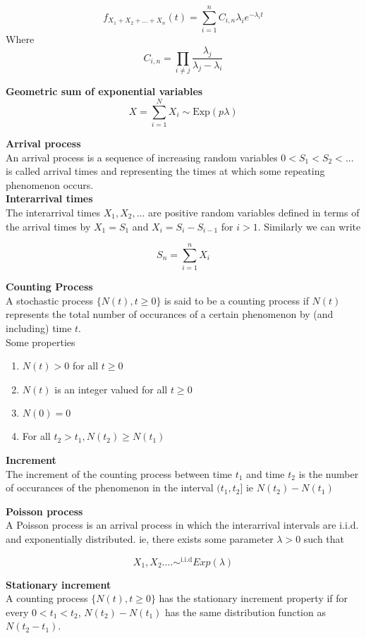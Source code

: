 $$f_{X_1 + X_2 +...+ X_n}(t) = \sum_{i=1}^n C_{i,n} \lambda_i e^{-\lambda_it}$$
Where
$$C_{i,n} = \prod_{i \neq j} \frac{\lambda_j}{\lambda_j - \lambda_i}$$

\textbf{Geometric sum of exponential variables}
$$X = \sum_{i=1}^N X_i \sim \text{Exp}(p \lambda)$$

\textbf{Arrival process}\\
An arrival process is a sequence of increasing random variables $0 < S_1 < S_2 < ...$ is called arrival times and representing the times at which some repeating phenomenon occurs.\\

\textbf{Interarrival times}\\
The interarrival times $X_1, X_2,...$ are positive random variables defined in terms of the arrival times by $X_1 = S_1$ and $X_i = S_i - S_{i-1}$ for $i > 1$. Similarly we can write

$$S_n = \sum_{i=1}^n X_i$$

\textbf{Counting Process}\\

A stochastic process $\{N(t), t \geq 0 \}$ is said to be a counting process if $N(t)$ represents the total number of occurances of a certain phenomenon by (and including) time $t$.\\

Some properties
\begin{enumerate}
	\item $N(t)>0$ for all $t \geq 0$
	\item $N(t)$ is an integer valued for all $t \geq 0$
	\item $N(0) = 0$ 
	\item For all $t_2 > t_1, N(t_2) \geq N(t_1)$
\end{enumerate}

\textbf{Increment}\\
The increment of the counting process between time $t_1$ and time $t_2$ is the number of occurances of the phenomenon in the interval $(t_1,t_2]$ ie $N(t_2) - N(t_1)$

\textbf{Poisson process}\\
A Poisson process is an arrival process in which the interarrival intervals are i.i.d. and exponentially distributed. ie, there exists some parameter $\lambda > 0$ such that

$$X_1, X_2.... \sim^{\text{i.i.d}} Exp(\lambda)$$

\textbf{Stationary increment}\\
A counting process $\{ N(t), t \geq 0 \}$ has the stationary increment property if for every $0 < t_1 < t_2$, $N(t_2) - N(t_1)$ has the same distribution function as $N(t_2 - t_1)$.\\

